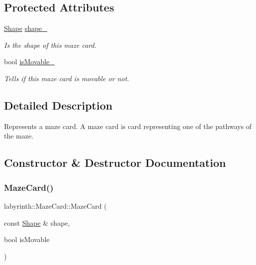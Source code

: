 \subsection*{Protected Attributes}
\begin{DoxyCompactItemize}
\item 
\mbox{\label{structlabyrinth_1_1_maze_card_a086fe56cb3e1b32c232aa627a21cc3d4}} 
\mbox{\hyperlink{structlabyrinth_1_1_maze_card_1_1_shape}{Shape}} \mbox{\hyperlink{structlabyrinth_1_1_maze_card_a086fe56cb3e1b32c232aa627a21cc3d4}{shape\+\_\+}}
\begin{DoxyCompactList}\small\item\em Is the shape of this maze card. \end{DoxyCompactList}\item 
\mbox{\label{structlabyrinth_1_1_maze_card_abcfe2b750317bbe79093fe663dbea6bc}} 
bool \mbox{\hyperlink{structlabyrinth_1_1_maze_card_abcfe2b750317bbe79093fe663dbea6bc}{is\+Movable\+\_\+}}
\begin{DoxyCompactList}\small\item\em Tells if this maze card is movable or not. \end{DoxyCompactList}\end{DoxyCompactItemize}


\subsection{Detailed Description}
Represents a maze card. A maze card is card representing one of the pathways of the maze. 

\subsection{Constructor \& Destructor Documentation}
\mbox{\label{structlabyrinth_1_1_maze_card_aeecd62a0f2f0336fb36cb44e479f4ce2}} 
\subsubsection{\texorpdfstring{MazeCard()}{MazeCard()}}
{\footnotesize\ttfamily labyrinth\+::\+Maze\+Card\+::\+Maze\+Card (\begin{DoxyParamCaption}\item[{const \mbox{\hyperlink{structlabyrinth_1_1_maze_card_1_1_shape}{Shape}} \&}]{shape,  }\item[{bool}]{is\+Movable }\end{DoxyParamCaption})}



